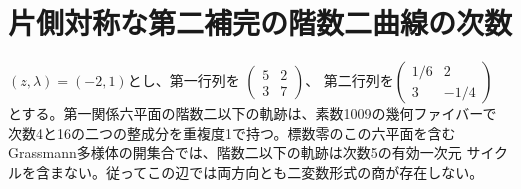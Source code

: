\section{片側対称な第二補完の階数二曲線の次数}
\label{sec:companion-rank-two-sections}
\begin{proposition}\label{prop:companion-no-binary-quintic}
$(z,\lambda)=(-2,1)$とし、第一行列を
$\left(\begin{smallmatrix}5&2\\3&7\end{smallmatrix}\right)$、
第二行列を$\left(\begin{smallmatrix}1/6&2\\3&-1/4\end{smallmatrix}\right)$
とする。第一関係六平面の階数二以下の軌跡は、素数1009の幾何ファイバーで
次数4と16の二つの整成分を重複度1で持つ。標数零のこの六平面を含む
Grassmann多様体の開集合では、階数二以下の軌跡は次数5の有効一次元
サイクルを含まない。従ってこの辺では両方向とも二変数形式の商が存在しない。
\end{proposition}
